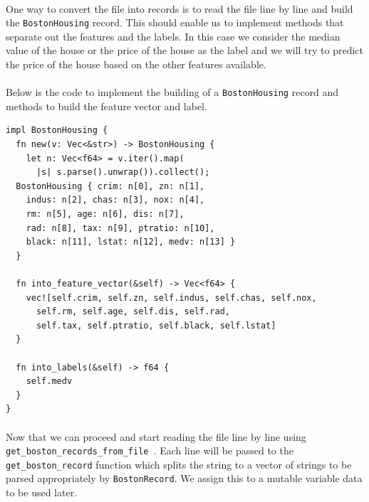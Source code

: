 \documentclass{book}
\begin{document}
\paragraph{}%
One way to convert the file into records is to read the file line by line and build the \lstinline{BostonHousing} record. This should enable us to implement methods that separate out the features and the labels. In this case we consider the median value of the house or the price of the house as the label and we will try to predict the price of the house based on the other features available.
\label{par:}

\paragraph{}%
Below is the code to implement the building of a \lstinline{BostonHousing} record and methods to build the feature vector and label.
\label{par:}

\begin{lstlisting}[caption={chapter2\\/ml\\-utils\\/src\\/datasets\\.rs}]
impl BostonHousing {
  fn new(v: Vec<&str>) -> BostonHousing {
    let n: Vec<f64> = v.iter().map(
      |s| s.parse().unwrap()).collect();
  BostonHousing { crim: n[0], zn: n[1],
    indus: n[2], chas: n[3], nox: n[4],
    rm: n[5], age: n[6], dis: n[7],
    rad: n[8], tax: n[9], ptratio: n[10],
    black: n[11], lstat: n[12], medv: n[13] }
  }

  fn into_feature_vector(&self) -> Vec<f64> {
    vec![self.crim, self.zn, self.indus, self.chas, self.nox,
      self.rm, self.age, self.dis, self.rad,
      self.tax, self.ptratio, self.black, self.lstat]
  }

  fn into_labels(&self) -> f64 {
    self.medv
  }
}
\end{lstlisting}

\paragraph{}%
Now that we can proceed and start reading the file line by line using \lstinline{get_boston_records_from_file }. Each line will be passed to the \lstinline{get_boston_record} function which splits the string to a vector of strings to be parsed appropriately by \lstinline{BostonRecord}. We assign this to a mutable variable data to be used later.
\label{par:}
\end{document}
